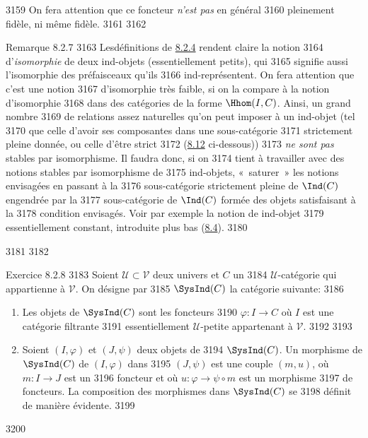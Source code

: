   3159	On fera attention que ce foncteur \emph{n'est pas} en général
  3160	pleinement fidèle, ni même fidèle.
  3161	
  3162	\begin{enonce*}[remark]{Remarque 8.2.7}
  3163	Les\pageoriginale définitions de \hyperref[I.sec8.2.4]{8.2.4} rendent claire la notion
  3164	d'\emph{isomorphie} de deux ind-objets (essentiellement petits), qui
  3165	signifie aussi l'isomorphie des préfaisceaux qu'ils
  3166	ind-représentent. On fera attention que c'est une notion
  3167	d'isomorphie très faible, si on la compare à la notion d'isomorphie
  3168	dans des catégories de la forme $\Hhom(I,C)$. Ainsi, un grand nombre
  3169	de relations assez naturelles qu'on peut imposer à un ind-objet (tel
  3170	que celle d'avoir ses composantes dans une sous-catégorie
  3171	strictement pleine donnée, ou celle d'être strict
  3172	(\hyperref[I.sec8.12]{8.12} ci-dessous))
  3173	\emph{ne sont pas} stables par isomorphisme. Il faudra donc, si on
  3174	tient à travailler avec des notions stables par isomorphisme de
  3175	ind-objets, « saturer » les notions envisagées en passant à la
  3176	sous-catégorie strictement pleine de $\Ind(C)$ engendrée par la
  3177	sous-catégorie de $\Ind(C)$ formée des objets satisfaisant à la
  3178	condition envisagés. Voir par exemple la notion de ind-objet
  3179	essentiellement constant, introduite plus bas (\hyperref[I.sec8.4]{8.4}).
  3180	\end{enonce*}
  3181	
  3182	\begin{enonce*}[remark]{Exercice 8.2.8}
  3183	Soient $𝒰\subset 𝒱$ deux univers et $C$ un
  3184	$𝒰$-catégorie qui appartienne à $𝒱$. On désigne par
  3185	$\SysInd(C)$ la catégorie suivante:
  3186	\begin{enumerate}
  3187	\renewcommand{\theenumi}{\alph{enumi}}
  3188	\renewcommand{\labelenumi}{\theenumi)}
  3189	\item Les objets de $\SysInd(C)$ sont les foncteurs
  3190	$\varphi:I\rightarrow C$ où $I$ est une catégorie filtrante
  3191	essentiellement $𝒰$-petite appartenant à $𝒱$.
  3192	
  3193	\item Soient $(I,\varphi)$ et $(J,\psi)$ deux objets de
  3194	$\SysInd(C)$. Un morphisme de $\SysInd(C)$ de $(I,\varphi)$ dans
  3195	$(J,\psi)$ est une couple $(m,u)$, où $m:I\rightarrow J$ est un
  3196	foncteur et où $u:\varphi\rightarrow \psi\circ m$ est un morphisme
  3197	de foncteurs. La composition des morphismes dans $\SysInd(C)$ se
  3198	définit de manière évidente.
  3199	\end{enumerate}
  3200	\end{enonce*}
